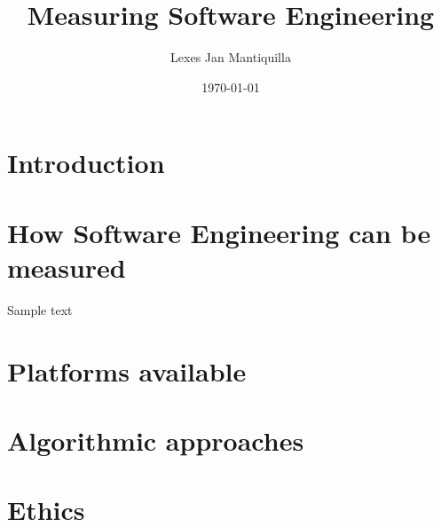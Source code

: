 \documentclass{article}
\title{Measuring Software Engineering}
\author{Lexes Jan Mantiquilla}
\date{\today}
\begin{document}
\maketitle
\tableofcontents
\newpage

\section{Introduction}
\section{How Software Engineering can be measured}
Sample text~\cite{fenton1999software}
\section{Platforms available}
\section{Algorithmic approaches}
\section{Ethics}



\end{document}
